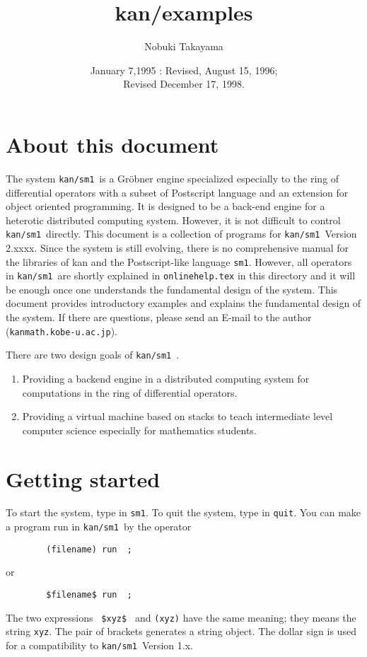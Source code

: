 \title{\bf kan/examples}
\author{Nobuki Takayama}
\date{January 7,1995 : Revised, August 15, 1996; \\ Revised December 17, 1998.}

\def\kansm{ {\tt kan/sm1}\ }
\def\pd#1{ \partial_{#1} }
\newtheorem{example}{Example}
\newtheorem{grammer}{Grammer}


\maketitle
\tableofcontents

\section{About this document}

The system \kansm is a Gr\"obner engine specialized especially
to the ring of differential operators with a subset of
Postscript language and an extension for object oriented programming. 
It is designed to be a back-end engine for a 
heterotic distributed computing system.
However, it is not difficult to control \kansm directly.
This document is a collection of programs for \kansm Version 2.xxxx.
Since the system is still evolving, there is no comprehensive manual
for the libraries of kan and the Postscript-like language {\tt sm1}.
However, all operators in \kansm are shortly explained in
{\tt onlinehelp.tex} in this directory and
it will be enough once one understands the fundamental design of the system.
This document provides introductory examples
and explains the fundamental design of the system.
If there are questions,
please send an E-mail to the author 
({\tt kan\at math.kobe-u.ac.jp}).


There are two design goals of \kansm.
\begin{enumerate}
\item Providing a backend engine in a distributed computing system for
      computations in the ring of differential operators.
\item Providing a virtual machine based on stacks to teach intermediate
level computer science especially for mathematics students.
\end{enumerate}

\section{Getting started}

To start the system, type in {\tt sm1}.
To quit the system, type in {\tt quit}.
You can make a program run in \kansm by the operator
\begin{verbatim}
        (filename) run  ;
\end{verbatim}
or
\begin{verbatim}
        $filename$ run  ;
\end{verbatim}
The two expressions \verb! $xyz$ ! and {\tt (xyz)} have the same meaning;
they means the string {\tt xyz}.
The pair of brackets generates a string object.
The dollar sign is used for a compatibility to \kansm Version 1.x.


